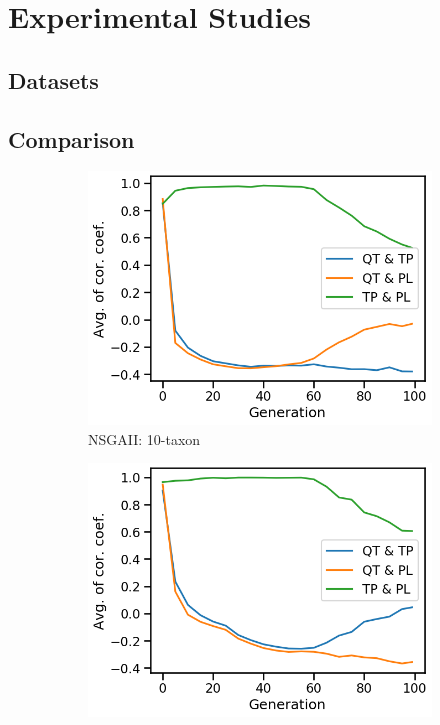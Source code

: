 \section{Experimental Studies}
\label{sec:experiment}
\subsection{Datasets}

\subsection{Comparison}
\begin{figure}[!htbp]
	\centering
	\begin{adjustwidth}{-1cm}{-1cm}
		\begin{subfigure}[b]{0.4\textwidth}
			\includegraphics[width=\textwidth]{Figure/10-taxon_NSGAII_corr_plot}
			\caption{NSGAII: 10-taxon}
		\end{subfigure}%
		\begin{subfigure}[b]{0.4\textwidth}
			\includegraphics[width=\textwidth]{Figure/11-taxon_NSGAII_corr_plot}

\end{subfigure}
\end{adjustwidth}
\end{figure}
